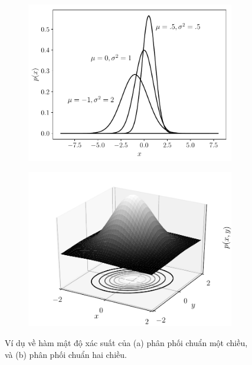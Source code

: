 \begin{figure}[t]
\begin{subfigure}{0.49\textwidth}
\includegraphics[width=0.99\linewidth]{Chapters/02_LinearAlgebra/30_prob/python/uni_norm.pdf}
\caption{}
\label{fig:30_2a}
\end{subfigure}
\begin{subfigure}{0.49\textwidth}
\includegraphics[width=0.99\linewidth]{Chapters/02_LinearAlgebra/30_prob/python/bi_norm.pdf}
\caption{}
\label{fig:30_2b}
\end{subfigure}
\caption{
Ví dụ về hàm mật độ xác suất của (a) phân phối chuẩn một chiều, và (b) phân
phối chuẩn hai chiều.}
\label{fig:30_2}
\end{figure}

